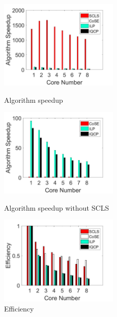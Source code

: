 \begin{figure}[tp]
\centering
\begin{minipage}[t]{0.3\linewidth}
\centering
\includegraphics[width=2.25in]{franz/Multiple}
\caption{Algorithm speedup}
\label{fig:Multiple}
\end{minipage}
\hfill
\begin{minipage}[t]{0.3\linewidth}
\centering
\includegraphics[width=2.25in]{franz/MultipleNoSCLS}
\caption{Algorithm speedup without SCLS}
\label{fig:MultipleNoSCLS}
\end{minipage}
\hfill
\begin{minipage}[t]{0.3\linewidth}
\centering
\includegraphics[width=2.25in]{franz/Efficiency}
 \caption{Efficiency}
 \label{fig:Efficiency}
\end{minipage}
\end{figure}


%

